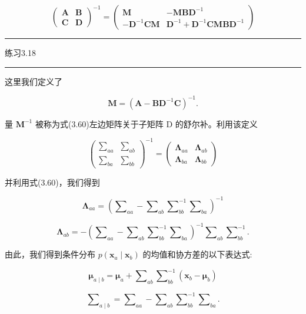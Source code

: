 \documentclass[10pt]{article}
\newcommand{\HRule}{\begin{center}\rule{0.9\linewidth}{0.2mm}\end{center}}
\begin{document}
\[
{\left( \begin{array}{ll} \mathbf{A} & \mathbf{B} \\  \mathbf{C} & \mathbf{D} \end{array}\right) }^{-1} = \left( \begin{matrix} \mathbf{M} &  - \mathbf{{MB}}{\mathbf{D}}^{-1} \\   - {\mathbf{D}}^{-1}\mathbf{{CM}} & {\mathbf{D}}^{-1} + {\mathbf{D}}^{-1}\mathbf{{CMB}}{\mathbf{D}}^{-1} \end{matrix}\right)  \tag{3.60}
\]

\HRule

练习3.18

\HRule

这里我们定义了

\[
\mathbf{M} = {\left( \mathbf{A} - {\mathbf{{BD}}}^{-1}\mathbf{C}\right) }^{-1}. \tag{3.61}
\]

量 \({\mathbf{M}}^{-1}\) 被称为式(3.60)左边矩阵关于子矩阵 D 的舒尔补。利用该定义

\[
{\left( \begin{matrix} {\mathbf{\sum }}_{aa} & {\mathbf{\sum }}_{ab} \\  {\mathbf{\sum }}_{ba} & {\mathbf{\sum }}_{bb} \end{matrix}\right) }^{-1} = \left( \begin{matrix} {\mathbf{\Lambda }}_{aa} & {\mathbf{\Lambda }}_{ab} \\  {\mathbf{\Lambda }}_{ba} & {\mathbf{\Lambda }}_{bb} \end{matrix}\right)  \tag{3.62}
\]

并利用式(3.60)，我们得到

\[
{\mathbf{\Lambda }}_{aa} = {\left( {\mathbf{\sum }}_{aa} - {\mathbf{\sum }}_{ab}{\mathbf{\sum }}_{bb}^{-1}{\mathbf{\sum }}_{ba}\right) }^{-1} \tag{3.63}
\]

\[
{\mathbf{\Lambda }}_{ab} =  - {\left( {\mathbf{\sum }}_{aa} - {\mathbf{\sum }}_{ab}{\mathbf{\sum }}_{bb}^{-1}{\mathbf{\sum }}_{ba}\right) }^{-1}{\mathbf{\sum }}_{ab}{\mathbf{\sum }}_{bb}^{-1}. \tag{3.64}
\]

由此，我们得到条件分布 \(p\left( {{\mathbf{x}}_{a} \mid  {\mathbf{x}}_{b}}\right)\) 的均值和协方差的以下表达式:

\[
{\mathbf{\mu }}_{a \mid  b} = {\mathbf{\mu }}_{a} + {\mathbf{\sum }}_{ab}{\mathbf{\sum }}_{bb}^{-1}\left( {{\mathbf{x}}_{b} - {\mathbf{\mu }}_{b}}\right)  \tag{3.65}
\]

\[
{\mathbf{\sum }}_{a \mid  b} = {\mathbf{\sum }}_{aa} - {\mathbf{\sum }}_{ab}{\mathbf{\sum }}_{bb}^{-1}{\mathbf{\sum }}_{ba}. \tag{3.66}
\]
\end{document}
